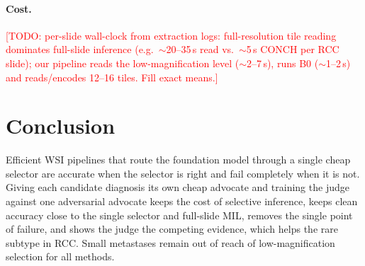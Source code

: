 \documentclass[runningheads]{llncs}
\newcommand{\todo}[1]{\textcolor{red}{[TODO: #1]}}
\begin{document}
\paragraph{Cost.} \todo{per-slide wall-clock from extraction logs: full-resolution tile reading dominates full-slide inference (e.g.\ $\sim$20--35\,s read vs.\ $\sim$5\,s CONCH per RCC slide); our pipeline reads the low-magnification level ($\sim$2--7\,s), runs B0 ($\sim$1--2\,s) and reads/encodes 12--16 tiles. Fill exact means.}

\section{Conclusion}
Efficient WSI pipelines that route the foundation model through a single cheap selector are accurate when the selector is right and fail completely when it is not. Giving each candidate diagnosis its own cheap advocate and training the judge against one adversarial advocate keeps the cost of selective inference, keeps clean accuracy close to the single selector and full-slide MIL, removes the single point of failure, and shows the judge the competing evidence, which helps the rare subtype in RCC. Small metastases remain out of reach of low-magnification selection for all methods.



\end{document}
